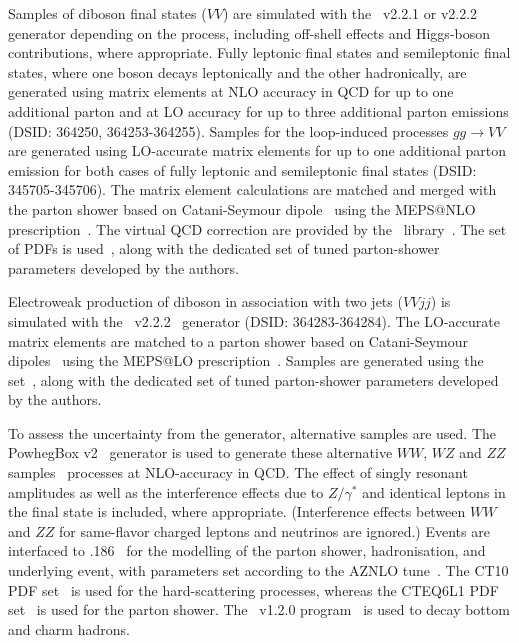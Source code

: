 Samples of diboson final states ($VV$) are simulated with the
\sherpa~v2.2.1 or v2.2.2~\cite{Bothmann:2019yzt} generator depending on the process,
including off-shell effects and Higgs-boson contributions, where appropriate.
Fully leptonic final states and semileptonic final states, where one boson
decays leptonically and the other hadronically, are generated using
matrix elements at NLO accuracy in QCD for up to one additional parton
and at LO accuracy for up to three additional parton
emissions (DSID\@: 364250, 364253-364255). Samples for the loop-induced processes $gg \to VV$ are
generated using LO-accurate matrix elements for up to one
additional parton emission for both cases of fully leptonic and
semileptonic final states (DSID\@: 345705-345706). The matrix element calculations are matched
and merged with the \sherpa parton shower based on Catani-Seymour
dipole~\cite{Gleisberg:2008fv,Schumann:2007mg} using the MEPS@NLO
prescription~\cite{Hoeche:2011fd,Hoeche:2012yf,Catani:2001cc,Hoeche:2009rj}.
The virtual QCD correction are provided by the
\openloops\ library~\cite{Cascioli:2011va,Denner:2016kdg}. The
\nnpdfnnlo set of PDFs is used~\cite{Ball:2014uwa}, along with the
dedicated set of tuned parton-shower parameters developed by the
\sherpa authors.

Electroweak production of diboson in association with two jets
($VVjj$) is simulated with the \sherpa~v2.2.2~\cite{Bothmann:2019yzt}
generator (DSID\@: 364283-364284). The LO-accurate matrix elements are matched to a parton
shower based on Catani-Seymour dipoles~\cite{Gleisberg:2008fv,Schumann:2007mg} using the MEPS@LO
prescription~\cite{Hoeche:2011fd,Hoeche:2012yf,Catani:2001cc,Hoeche:2009rj}.
Samples are generated using the \nnpdfnnlo set~\cite{Ball:2014uwa},
along with the dedicated set of tuned parton-shower parameters
developed by the \sherpa authors.

To assess the uncertainty from the generator, alternative samples are used. 
The PowhegBox v2~\cite{Nason:2004rx,Frixione:2007vw,Alioli:2010xd} generator
is used to generate these alternative $WW$, $WZ$ and $ZZ$ samples~\cite{Nason:2013ydw}
processes at NLO-accuracy in QCD. The effect of singly resonant
amplitudes as well as the interference effects due to $Z/\gamma^*$ and
identical leptons in the final state is included, where appropriate. (Interference
effects between $WW$ and $ZZ$ for same-flavor charged leptons and
neutrinos are ignored.)
Events are interfaced to \pythia{}.186~\cite{Sjostrand:2007gs}
for the modelling of the parton shower, hadronisation, and underlying
event, with parameters set according to the AZNLO
tune~\cite{STDM-2012-23}. The CT10 PDF set~\cite{Lai:2010vv} is used
for the hard-scattering processes, whereas the CTEQ6L1 PDF
set~\cite{Pumplin:2002vw} is used for the parton shower. The \evtgen~v1.2.0
program~\cite{EvtGen} is used to decay bottom and charm hadrons.

